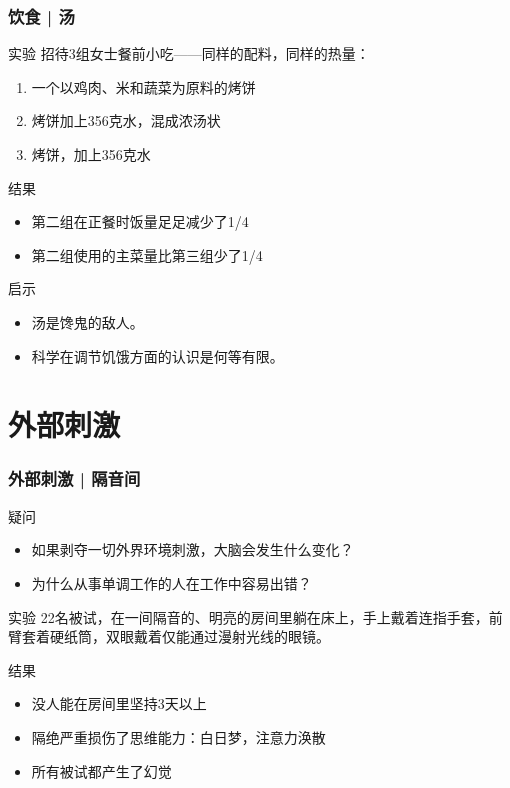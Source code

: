 \begin{frame}
  \frametitle{饮食 | 汤}
  \begin{block}{实验}
    招待3组女士餐前小吃——同样的配料，同样的热量：
    \begin{enumerate}
      \item 一个以鸡肉、米和蔬菜为原料的烤饼
      \item 烤饼加上356克水，混成浓汤状
      \item 烤饼，加上356克水
    \end{enumerate}
  \end{block}
  \pause
  \begin{block}{结果}
    \begin{itemize}
      \item 第二组在正餐时饭量足足减少了1/4
      \item 第二组使用的主菜量比第三组少了1/4
    \end{itemize}
  \end{block}
  \pause
  \begin{block}{启示}
    \begin{itemize}
      \item \alert{汤是馋鬼的敌人。}
      \item 科学在调节饥饿方面的认识是何等有限。
    \end{itemize}
  \end{block}
\end{frame}

\section{外部刺激}
\begin{frame}
  \frametitle{外部刺激 | 隔音间}
  \begin{block}{疑问}
    \begin{itemize}
      \item 如果剥夺一切外界环境刺激，大脑会发生什么变化？
      \item 为什么\alert{从事单调工作的人在工作中容易出错}？
    \end{itemize}
  \end{block}
  \pause
  \begin{block}{实验}
22名被试，在一间隔音的、明亮的房间里躺在床上，手上戴着连指手套，前臂套着硬纸筒，双眼戴着仅能通过漫射光线的眼镜。
  \end{block}
  \pause
  \begin{block}{结果}
    \begin{itemize}
      \item 没人能在房间里坚持3天以上
      \item 隔绝严重损伤了思维能力：白日梦，注意力涣散
      \item 所有被试都产生了幻觉
    \end{itemize}
  \end{block}
\end{frame}

